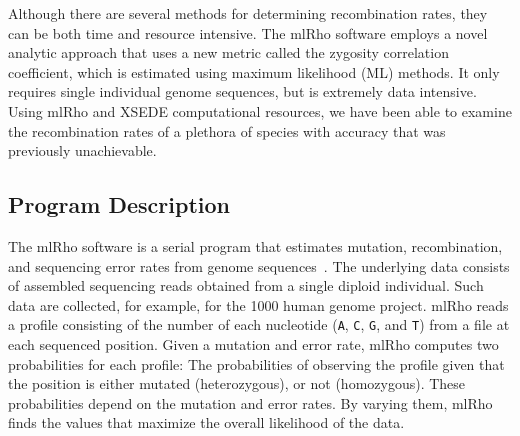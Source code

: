 \documentclass{sig-alternate}
\begin{document}
Although there are several methods for determining recombination rates, they can be both time and resource intensive. The mlRho software employs a novel analytic approach that uses a new metric called the zygosity correlation coefficient, which is estimated using maximum likelihood (ML) methods. It only requires single individual genome sequences, but is extremely data intensive. Using mlRho and XSEDE computational resources, we have been able to examine the recombination rates of a plethora of species with accuracy that was previously unachievable. 

%

\subsection{Program Description}
The mlRho software is a serial program that estimates mutation, recombination, and sequencing error rates from
genome sequences~\cite{MEC:MEC4482}. The underlying data consists of assembled sequencing reads obtained from
a single diploid individual. Such data are collected, for example, for the 1000 human genome project. mlRho reads a profile consisting of the number of each nucleotide (\texttt{A}, \texttt{C}, \texttt{G}, and \texttt{T}) from a file at each sequenced position.
   Given a mutation and error rate, mlRho computes two probabilities for each profile: The
probabilities of observing the profile given that the position is either mutated (heterozygous), or not
(homozygous). These probabilities depend on the mutation and error rates. By varying them, mlRho finds the
values that maximize the overall likelihood of the data.
\end{document}
